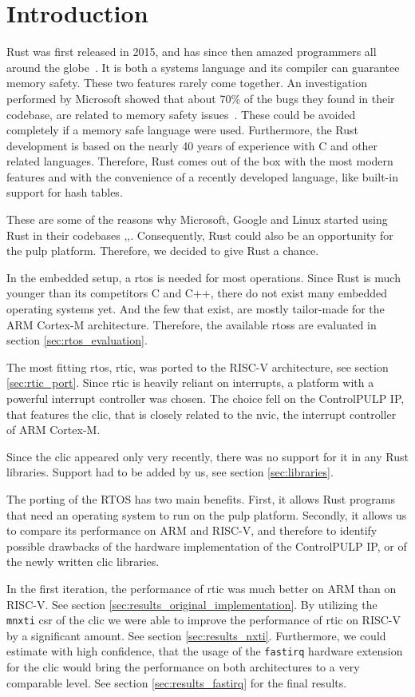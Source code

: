 \chapter{Introduction}
\label{ch:introduction}

Rust was first released in 2015, and has since then amazed programmers all around the globe~\cite{RustWikipedia}. It is both a systems language and its compiler can guarantee memory safety. These two features rarely come together. An investigation performed by Microsoft showed that about 70\% of the bugs they found in their codebase, are related to memory safety issues~\cite{MemeorySafety70}. These could be avoided completely if a memory safe language were used. Furthermore, the Rust development is based on the nearly 40 years of experience with C and other related languages. Therefore, Rust comes out of the box with the most modern features and with the convenience of a recently developed language, like built-in support for hash tables.

These are some of the reasons why Microsoft, Google and Linux started using Rust in their codebases \cite{MicrosoftRust},\cite{GoogleRust},\cite{LinuxRust}. Consequently, Rust could also be an opportunity for the \gls{pulp} platform. Therefore, we decided to give Rust a chance.

In the embedded setup, a \gls{rtos} is needed for most operations. Since Rust is much younger than its competitors C and C++, there do not exist many embedded operating systems yet. And the few that exist, are mostly tailor-made for the ARM Cortex-M architecture. Therefore, the available \gls{rtos}s are evaluated in section \ref{sec:rtos_evaluation}.

The most fitting \gls{rtos}, \gls{rtic}, was ported to the RISC-V architecture, see section \ref{sec:rtic_port}. Since \gls{rtic} is heavily reliant on interrupts, a platform with a powerful interrupt controller was chosen. The choice fell on the ControlPULP IP, that features the \acrfull{clic}, that is closely related to the \gls{nvic}, the interrupt controller of ARM Cortex-M.

Since the \gls{clic} appeared only very recently, there was no support for it in any Rust libraries. Support had to be added by us, see section \ref{sec:libraries}.

The porting of the RTOS has two main benefits. First, it allows Rust programs that need an operating system to run on the \gls{pulp} platform. Secondly, it allows us to compare its performance on ARM and RISC-V, and therefore to identify possible drawbacks of the hardware implementation of the ControlPULP IP, or of the newly written \gls{clic} libraries.

In the first iteration, the performance of \gls{rtic} was much better on ARM than on RISC-V. See section \ref{sec:results_original_implementation}. By utilizing the \texttt{mnxti} \gls{csr} of the \gls{clic} we were able to improve the performance of \gls{rtic} on RISC-V by a significant amount. See section \ref{sec:results_nxti}. Furthermore, we could estimate with high confidence, that the usage of the \texttt{fastirq} hardware extension for the \gls{clic} would bring the performance on both architectures to a very comparable level. See section \ref{sec:results_fastirq} for the final results.
